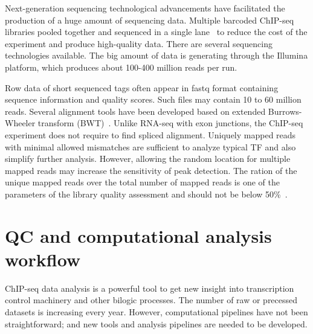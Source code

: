 Next-generation sequencing technological advancements have facilitated the production of a huge amount of sequencing data. 
Multiple barcoded ChIP-seq libraries pooled together and sequenced in a single lane~\cite{craig2008identification} to reduce the cost of the experiment and produce high-quality data.
There are several sequencing technologies available. The big amount of data is generating through the Illumina platform, which produces about 100-400 million reads per run.

Row data of short sequenced tags often appear in fastq format containing sequence information and quality scores. Such files may contain 10 to 60 million reads. Several alignment tools have been developed based on extended Burrows-Wheeler transform (BWT)~\cite{li2009fast, siren2014indexing}.
Unlike RNA-seq with exon junctions, the ChIP-seq experiment does not require to find spliced alignment. 
Uniquely mapped reads with minimal allowed mismatches are sufficient to analyze typical TF and also simplify further analysis. 
However, allowing the random location for multiple mapped reads may increase the sensitivity of peak detection. 
The ration of the unique mapped reads over the total number of mapped reads is one of the parameters of the library quality assessment and should not be below 50\%~\cite{shin2013computational}.


\section{QC and computational analysis workflow}

ChIP-seq data analysis is a powerful tool to get new insight into transcription control machinery and other bilogic processes. 
The number of raw or precessed datasets is increasing every year. 
However, computational pipelines have not been straightforward; 
and new tools and analysis pipelines are needed to be developed.

